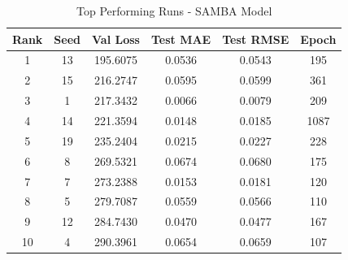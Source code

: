 \begin{table}[ht]
\centering
\caption{Top Performing Runs - SAMBA Model}
\label{tab:samba_results}
\begin{tabular}{cccccc}
\hline
\textbf{Rank} & \textbf{Seed} & \textbf{Val Loss} & \textbf{Test MAE} & \textbf{Test RMSE} & \textbf{Epoch} \\
\hline
1 & 13 & 195.6075 & 0.0536 & 0.0543 & 195 \\
2 & 15 & 216.2747 & 0.0595 & 0.0599 & 361 \\
3 & 1 & 217.3432 & 0.0066 & 0.0079 & 209 \\
4 & 14 & 221.3594 & 0.0148 & 0.0185 & 1087 \\
5 & 19 & 235.2404 & 0.0215 & 0.0227 & 228 \\
6 & 8 & 269.5321 & 0.0674 & 0.0680 & 175 \\
7 & 7 & 273.2388 & 0.0153 & 0.0181 & 120 \\
8 & 5 & 279.7087 & 0.0559 & 0.0566 & 110 \\
9 & 12 & 284.7430 & 0.0470 & 0.0477 & 167 \\
10 & 4 & 290.3961 & 0.0654 & 0.0659 & 107 \\
\hline
\end{tabular}
\end{table}
